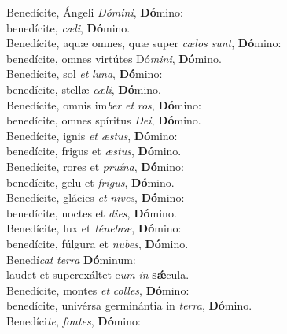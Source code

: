 \evenverse Benedícite, Ángeli \textit{Dó}\textit{mi}\textit{ni}, \textbf{Dó}mino:~\*\\
\evenverse benedícite, \textit{cæ}\textit{li}, \textbf{Dó}mino.\\
\oddverse Benedícite, aquæ omnes, quæ super \textit{cæ}\textit{los} \textit{sunt}, \textbf{Dó}mino:~\*\\
\oddverse benedícite, omnes virtútes Dó\textit{mi}\textit{ni}, \textbf{Dó}mino.\\
\evenverse Benedícite, sol \textit{et} \textit{lu}\textit{na}, \textbf{Dó}mino:~\*\\
\evenverse benedícite, stellæ \textit{cæ}\textit{li}, \textbf{Dó}mino.\\
\oddverse Benedícite, omnis im\textit{ber} \textit{et} \textit{ros}, \textbf{Dó}mino:~\*\\
\oddverse benedícite, omnes spíritus \textit{De}\textit{i}, \textbf{Dó}mino.\\
\evenverse Benedícite, ignis \textit{et} \textit{æ}\textit{stus}, \textbf{Dó}mino:~\*\\
\evenverse benedícite, frigus et \textit{æ}\textit{stus}, \textbf{Dó}mino.\\
\oddverse Benedícite, rores et \textit{pru}\textit{í}\textit{na}, \textbf{Dó}mino:~\*\\
\oddverse benedícite, gelu et \textit{fri}\textit{gus}, \textbf{Dó}mino.\\
\evenverse Benedícite, glácies \textit{et} \textit{ni}\textit{ves}, \textbf{Dó}mino:~\*\\
\evenverse benedícite, noctes et \textit{di}\textit{es}, \textbf{Dó}mino.\\
\oddverse Benedícite, lux et \textit{té}\textit{ne}\textit{bræ}, \textbf{Dó}mino:~\*\\
\oddverse benedícite, fúlgura et \textit{nu}\textit{bes}, \textbf{Dó}mino.\\
\evenverse Benedí\textit{cat} \textit{ter}\textit{ra} \textbf{Dó}minum:~\*\\
\evenverse laudet et superexáltet e\textit{um} \textit{in} \textbf{sǽ}cula.\\
\oddverse Benedícite, montes \textit{et} \textit{col}\textit{les}, \textbf{Dó}mino:~\*\\
\oddverse benedícite, univérsa germinántia in \textit{ter}\textit{ra}, \textbf{Dó}mino.\\
\evenverse Benedíci\textit{te}, \textit{fon}\textit{tes}, \textbf{Dó}mino:~\*\\
